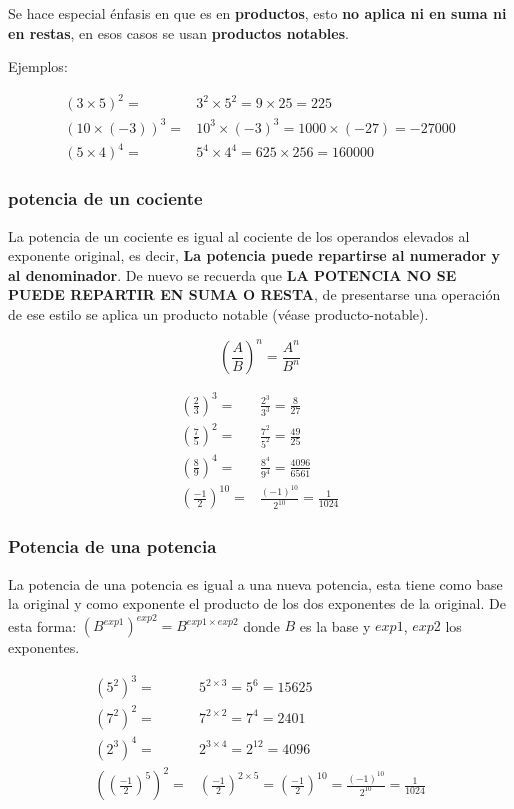 \documentclass[12pt]{article}
\begin{document}
    Se hace especial énfasis en que es en \textbf{productos}, esto \textbf{no
    aplica ni en suma ni en restas}, en esos casos se usan \textbf{productos notables}.

    Ejemplos:

    \begin{align*}
        (3\times5)^2 =&3^2\times5^2= 9\times25=225		\\
        (10\times(-3))^3 =& 10^3 \times (-3)^3 = 1000\times(-27) = -27000\\
        (5\times4)^4 =&5^4\times4^4 = 625\times256= 160000
    \end{align*}



    \subsubsection*{potencia de un cociente}
    La potencia de un cociente es igual al cociente de los operandos elevados al
    exponente original, es decir, \textbf{La potencia puede repartirse al numerador
    y al denominador}. De nuevo se recuerda que \textbf{LA POTENCIA NO SE PUEDE
    REPARTIR EN SUMA O RESTA}, de presentarse una operación de ese estilo se
    aplica un producto notable (véase \refname{producto-notable}).

    $$ \left(\frac{A}{B}\right)^{n} = \frac{A^n}{B^n}  $$

    \begin{align*}
       \left(\frac{2}{3}\right)^{3} =& \frac{2^3}{3^3}= \frac{8}{27}	\\
        \left(\frac{7}{5}\right)^{2} =& \frac{7^2}{5^2} =\frac{49}{25} \\
        \left(\frac{8}{9}\right)^{4} =&\frac{8^4}{9^4} = \frac{4096}{6561}\\
        \left(\frac{-1}{2}\right)^{10} =& \frac{(-1)^10}{2^10} = \frac{1}{1024}
    \end{align*}

    \subsubsection*{Potencia de una potencia}
    La potencia de una potencia es igual a una nueva potencia, esta tiene como base
    la original y como exponente el producto de los dos exponentes
    de la original. De esta forma: $(B^{exp1})^{exp2} = B^{exp1\times exp2}$
    donde $B$ es la base y $exp1$, $exp2$ los exponentes.

    \begin{align*}
        \left(5^2\right)^{3} =& 5^{2\times3}= 5^6 =15625	\\
        \left(7^2\right)^{2} =& 7^{2\times2}= 7^4  =2401 \\
        \left(2^3\right)^{4} =& 2^{3\times4}=2^12  = 4096\\
        \left(\left(\frac{-1}{2}\right)^{5}\right)^2 =&\left(\frac{-1}{2}\right)^{2\times5}= \left(\frac{-1}{2}\right)^{10}=\frac{(-1)^{10}}{2^{10}} = \frac{1}{1024}
    \end{align*}
\end{document}
